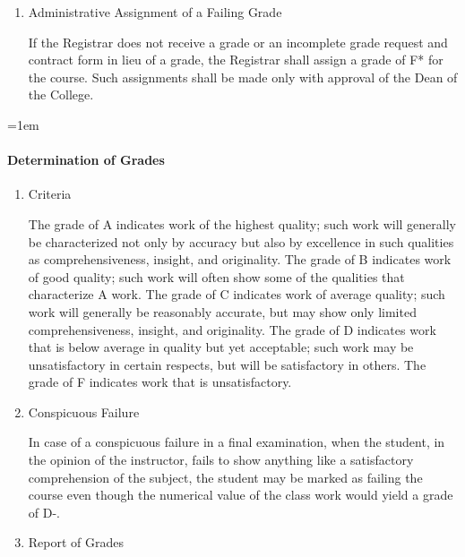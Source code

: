 \documentclass{manual}
\let\oldparagraph\paragraph
\renewcommand\paragraph{\leftskip=1em\oldparagraph}
\newcommand{\itemLevelA}{\alph*.}
\newcommand{\itemRefA}{\alph*}
\begin{document}
\begin{enumerate}[label=\itemLevelA,ref=\itemRefA]
	\item Administrative Assignment of a Failing Grade

		If the Registrar does not receive a grade or an incomplete grade request and contract form in lieu of a grade, the Registrar shall assign a grade of F* for the course. Such assignments shall be made only with approval of the Dean of the College.

	\end{enumerate}

\paragraph{Determination of Grades}\label{par:DeterminationOfGrades}

	\begin{enumerate}[label=\itemLevelA,ref=\itemRefA]
	\item Criteria

		The grade of A indicates work of the highest quality; such work will generally be characterized not only by accuracy but also by excellence in such qualities as comprehensiveness, insight, and originality. The grade of B indicates work of good quality; such work will often show some of the qualities that characterize A work. The grade of C indicates work of average quality; such work will generally be reasonably accurate, but may show only limited comprehensiveness, insight, and originality. The grade of D indicates work that is below average in quality but yet acceptable; such work may be unsatisfactory in certain respects, but will be satisfactory in others. The grade of F indicates work that is unsatisfactory.
	
	\item Conspicuous Failure

		In case of a conspicuous failure in a final examination, when the student, in the opinion of the instructor, fails to show anything like a satisfactory comprehension of the subject, the student may be marked as failing the course even though the numerical value of the class work would yield a grade of D-.
	
	\item Report of Grades \label{item:ReportOfGrades}


\end{enumerate}
\end{document}
